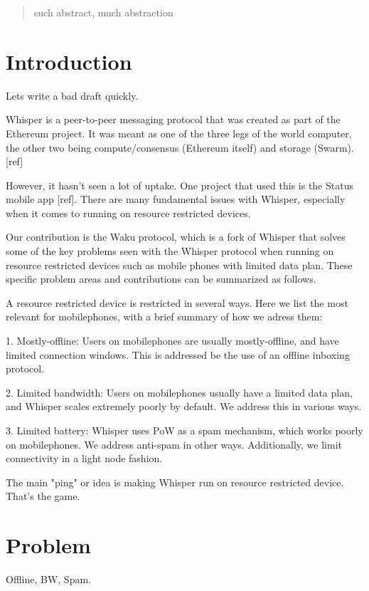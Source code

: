 \documentclass[12pt]{article}
\begin{document}
\maketitle
\begin{abstract}
  such abstract, much abstraction
\end{abstract}

\section{Introduction}

Lets write a bad draft quickly.

Whisper is a peer-to-peer messaging protocol that was created as part of the Ethereum project. It was meant as one of the three legs of the world computer, the other two being compute/consensus (Ethereum itself) and storage (Swarm). [ref]

However, it hasn't seen a lot of uptake. One project that used this is the Status mobile app [ref]. There are many fundamental issues with Whisper, especially when it comes to running on resource restricted devices.

Our contribution is the Waku protocol, which is a fork of Whisper that solves some of the key problems seen with the Whisper protocol when running on resource restricted devices such as mobile phones with limited data plan. These specific problem areas and contributions can be summarized as follows.

A resource restricted device is restricted in several ways. Here we list the most relevant for mobilephones, with a brief summary of how we adress them:

1. Mostly-offline: Users on mobilephones are usually mostly-offline, and have limited connection windows. This is addressed be the use of an offline inboxing protocol.

2. Limited bandwidth: Users on mobilephones usually have a limited data plan, and Whisper scales extremely poorly by default. We address this in various ways.

3. Limited battery: Whisper uses PoW as a spam mechanism, which works poorly on mobilephones. We address anti-spam in other ways. Additionally, we limit connectivity in a light node fashion.

The main "ping" or idea is making Whisper run on resource restricted device. That's the game.

\section{Problem}
Offline, BW, Spam.
\end{document}
